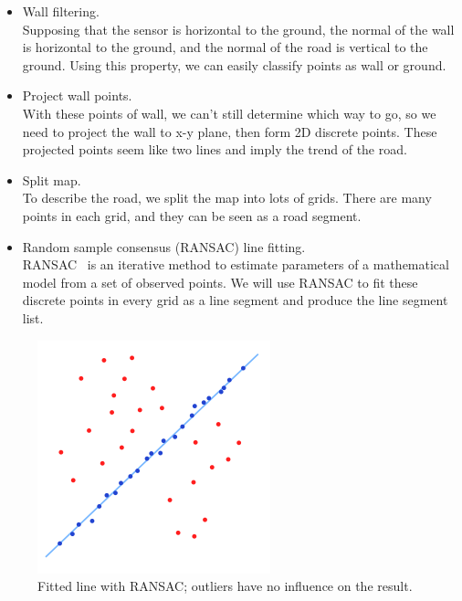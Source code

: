 \documentclass[letterpaper, 10 pt, conference]{ieeeconf}  %
\begin{document}
\begin{itemize}

\item Wall filtering.\\ 
Supposing that the sensor is horizontal to the ground, the normal of the wall is horizontal to the ground, and the normal of the road is vertical to the ground. Using this property, we can easily classify points as wall or ground.

\item Project wall points.\\ 
With these points of wall, we can't still determine which way to go, so we need to project the wall to x-y plane, then form 2D discrete points. These projected points seem like two lines and imply the trend of the road. 

\item Split map.\\ 
To describe the road, we split the map into lots of grids. There are many points in each grid, and they can be seen as a road segment.

\item Random sample consensus (RANSAC) line fitting.\\ 
RANSAC~\cite{fischler1981random, Rusu_ICRA2011_PCL} is an iterative method to estimate parameters of a mathematical model from a set of observed points. We will use RANSAC to fit these discrete points in every grid as a line segment and produce the line segment list.

\end{itemize}

\begin{figure}[h!] %
\includegraphics[width=0.5\columnwidth]{RANSAC.png}
\centering
\caption{Fitted line with RANSAC; outliers have no influence on the result.}
\end{figure}
\end{document}
